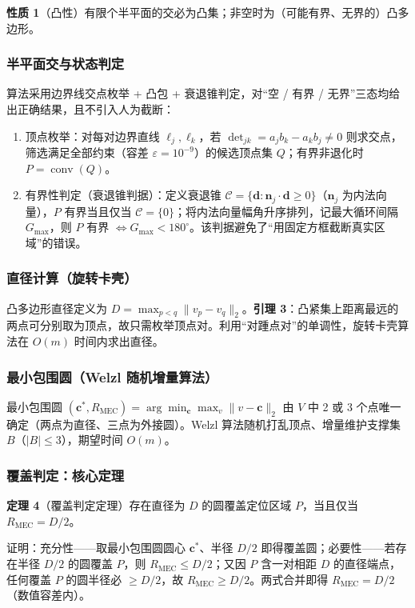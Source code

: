 \documentclass[12pt,a4paper]{article}
\newcommand{\Rmec}{R_{\mathrm{MEC}}}
\begin{document}
\textbf{性质 1}（凸性）\quad 有限个半平面的交必为凸集；非空时为（可能有界、无界的）凸多边形。

\subsubsection{半平面交与状态判定}
算法采用边界线交点枚举 + 凸包 + 衰退锥判定，对“空 / 有界 / 无界”三态均给出正确结果，且不引入人为截断：
\begin{enumerate}
\item 顶点枚举：对每对边界直线 $\ell_j,\ell_k$，若 $\det_{jk}=a_jb_k-a_kb_j\neq 0$ 则求交点，筛选满足全部约束（容差 $\varepsilon=10^{-9}$）的候选顶点集 $Q$；有界非退化时 $P=\operatorname{conv}(Q)$。
\item 有界性判定（衰退锥判据）：定义衰退锥 $\mathcal{C}=\{\mathbf{d}:\mathbf{n}_j\cdot\mathbf{d}\ge 0\}$（$\mathbf{n}_j$ 为内法向量），$P$ 有界当且仅当 $\mathcal{C}=\{0\}$；将内法向量幅角升序排列，记最大循环间隔 $G_{\max}$，则 $P$ 有界 $\Leftrightarrow G_{\max}<180^{\circ}$。该判据避免了“用固定方框截断真实区域”的错误。
\end{enumerate}

\subsubsection{直径计算（旋转卡壳）}
凸多边形直径定义为 $D=\max_{p<q}\lVert v_p-v_q\rVert_2$。\textbf{引理 3}：凸紧集上距离最远的两点可分别取为顶点，故只需枚举顶点对。利用“对踵点对”的单调性，旋转卡壳算法在 $O(m)$ 时间内求出直径。

\subsubsection{最小包围圆（Welzl 随机增量算法）}
最小包围圆 $(\mathbf{c}^{*},\Rmec)=\arg\min_{\mathbf{c}}\max_{v}\lVert v-\mathbf{c}\rVert_2$ 由 $V$ 中 2 或 3 个点唯一确定（两点为直径、三点为外接圆）。Welzl 算法随机打乱顶点、增量维护支撑集 $B$（$|B|\le 3$），期望时间 $O(m)$。

\subsubsection{覆盖判定：核心定理}
\textbf{定理 4}（覆盖判定定理）\quad 存在直径为 $D$ 的圆覆盖定位区域 $P$，当且仅当 $\Rmec=D/2$。

证明：充分性——取最小包围圆圆心 $\mathbf{c}^{*}$、半径 $D/2$ 即得覆盖圆；必要性——若存在半径 $D/2$ 的圆覆盖 $P$，则 $\Rmec\le D/2$；又因 $P$ 含一对相距 $D$ 的直径端点，任何覆盖 $P$ 的圆半径必 $\ge D/2$，故 $\Rmec\ge D/2$。两式合并即得 $\Rmec=D/2$（数值容差内）。
\end{document}
